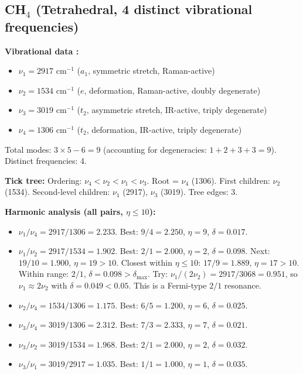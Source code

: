 \documentclass[11pt,a4paper]{article}
\theoremstyle{definition}
\theoremstyle{remark}
\begin{document}
\subsection{CH$_4$ (Tetrahedral, 4 distinct vibrational frequencies)}

\textbf{Vibrational data \citep{shimanouchi1972, nist_webbook}:}
\begin{itemize}[nosep]
\item $\nu_1 = 2917$ cm$^{-1}$ ($a_1$, symmetric stretch, Raman-active)
\item $\nu_2 = 1534$ cm$^{-1}$ ($e$, deformation, Raman-active, doubly degenerate)
\item $\nu_3 = 3019$ cm$^{-1}$ ($t_2$, asymmetric stretch, IR-active, triply degenerate)
\item $\nu_4 = 1306$ cm$^{-1}$ ($t_2$, deformation, IR-active, triply degenerate)
\end{itemize}
Total modes: $3 \times 5 - 6 = 9$ (accounting for degeneracies: $1 + 2 + 3 + 3 = 9$). Distinct frequencies: 4.

\textbf{Tick tree:} Ordering: $\nu_4 < \nu_2 < \nu_1 < \nu_3$. Root = $\nu_4$ (1306). First children: $\nu_2$ (1534). Second-level children: $\nu_1$ (2917), $\nu_3$ (3019). Tree edges: 3.

\textbf{Harmonic analysis (all pairs, $\eta \leq 10$):}

\begin{itemize}[nosep]
\item $\nu_1/\nu_4 = 2917/1306 = 2.233$. Best: $9/4 = 2.250$, $\eta = 9$, $\delta = 0.017$.
\item $\nu_1/\nu_2 = 2917/1534 = 1.902$. Best: $2/1 = 2.000$, $\eta = 2$, $\delta = 0.098$. Next: $19/10 = 1.900$, $\eta = 19 > 10$. Closest within $\eta \leq 10$: $17/9 = 1.889$, $\eta = 17 > 10$. Within range: $2/1$, $\delta = 0.098 > \delta_{\max}$. Try: $\nu_1/(2\nu_2) = 2917/3068 = 0.951$, so $\nu_1 \approx 2\nu_2$ with $\delta = 0.049 < 0.05$. This is a Fermi-type $2/1$ resonance.
\item $\nu_2/\nu_4 = 1534/1306 = 1.175$. Best: $6/5 = 1.200$, $\eta = 6$, $\delta = 0.025$.
\item $\nu_3/\nu_4 = 3019/1306 = 2.312$. Best: $7/3 = 2.333$, $\eta = 7$, $\delta = 0.021$.
\item $\nu_3/\nu_2 = 3019/1534 = 1.968$. Best: $2/1 = 2.000$, $\eta = 2$, $\delta = 0.032$.
\item $\nu_3/\nu_1 = 3019/2917 = 1.035$. Best: $1/1 = 1.000$, $\eta = 1$, $\delta = 0.035$.
\end{itemize}
\end{document}
